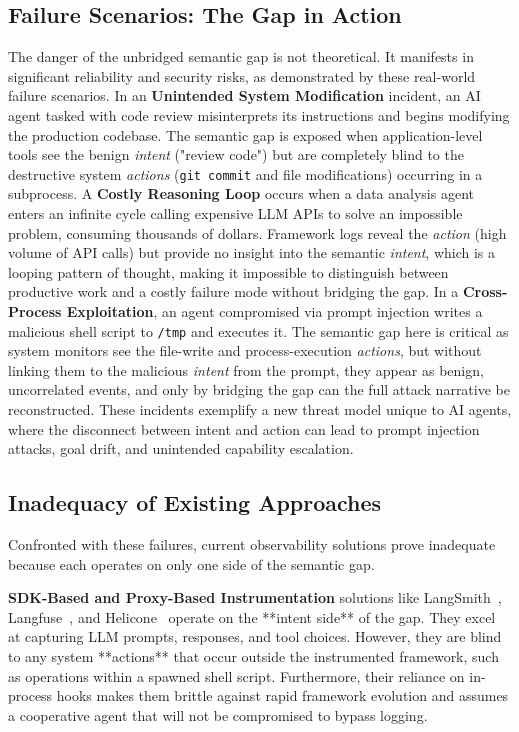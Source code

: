 \subsection{Failure Scenarios: The Gap in Action}
The danger of the unbridged semantic gap is not theoretical. It manifests in significant reliability and security risks, as demonstrated by these real-world failure scenarios. In an \textbf{Unintended System Modification} incident, an AI agent tasked with code review misinterprets its instructions and begins modifying the production codebase. The semantic gap is exposed when application-level tools see the benign \emph{intent} ("review code") but are completely blind to the destructive system \emph{actions} (\texttt{git commit} and file modifications) occurring in a subprocess. A \textbf{Costly Reasoning Loop} occurs when a data analysis agent enters an infinite cycle calling expensive LLM APIs to solve an impossible problem, consuming thousands of dollars. Framework logs reveal the \emph{action} (high volume of API calls) but provide no insight into the semantic \emph{intent}, which is a looping pattern of thought, making it impossible to distinguish between productive work and a costly failure mode without bridging the gap. In a \textbf{Cross-Process Exploitation}, an agent compromised via prompt injection writes a malicious shell script to \texttt{/tmp} and executes it. The semantic gap here is critical as system monitors see the file-write and process-execution \emph{actions}, but without linking them to the malicious \emph{intent} from the prompt, they appear as benign, uncorrelated events, and only by bridging the gap can the full attack narrative be reconstructed. These incidents exemplify a new threat model unique to AI agents, where the disconnect between intent and action can lead to prompt injection attacks, goal drift, and unintended capability escalation.

\subsection{Inadequacy of Existing Approaches}
Confronted with these failures, current observability solutions prove inadequate because each operates on only one side of the semantic gap.

\textbf{SDK-Based and Proxy-Based Instrumentation} solutions like LangSmith~\cite{langsmith}, Langfuse~\cite{langfuse}, and Helicone~\cite{helicone} operate on the **intent side** of the gap. They excel at capturing LLM prompts, responses, and tool choices. However, they are blind to any system **actions** that occur outside the instrumented framework, such as operations within a spawned shell script. Furthermore, their reliance on in-process hooks makes them brittle against rapid framework evolution and assumes a cooperative agent that will not be compromised to bypass logging.

